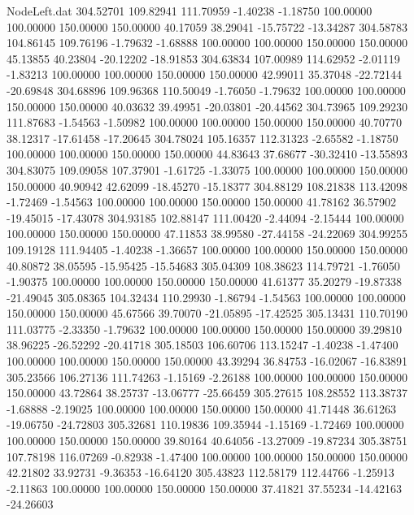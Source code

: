 \begin{filecontents}{NodeLeft.dat}
 304.52701  109.82941  111.70959    -1.40238   -1.18750  100.00000  100.00000  150.00000  150.00000   40.17059   38.29041  -15.75722  -13.34287
 304.58783  104.86145  109.76196    -1.79632   -1.68888  100.00000  100.00000  150.00000  150.00000   45.13855   40.23804  -20.12202  -18.91853
 304.63834  107.00989  114.62952    -2.01119   -1.83213  100.00000  100.00000  150.00000  150.00000   42.99011   35.37048  -22.72144  -20.69848
 304.68896  109.96368  110.50049    -1.76050   -1.79632  100.00000  100.00000  150.00000  150.00000   40.03632   39.49951  -20.03801  -20.44562
 304.73965  109.29230  111.87683    -1.54563   -1.50982  100.00000  100.00000  150.00000  150.00000   40.70770   38.12317  -17.61458  -17.20645
 304.78024  105.16357  112.31323    -2.65582   -1.18750  100.00000  100.00000  150.00000  150.00000   44.83643   37.68677  -30.32410  -13.55893
 304.83075  109.09058  107.37901    -1.61725   -1.33075  100.00000  100.00000  150.00000  150.00000   40.90942   42.62099  -18.45270  -15.18377
 304.88129  108.21838  113.42098    -1.72469   -1.54563  100.00000  100.00000  150.00000  150.00000   41.78162   36.57902  -19.45015  -17.43078
 304.93185  102.88147  111.00420    -2.44094   -2.15444  100.00000  100.00000  150.00000  150.00000   47.11853   38.99580  -27.44158  -24.22069
 304.99255  109.19128  111.94405    -1.40238   -1.36657  100.00000  100.00000  150.00000  150.00000   40.80872   38.05595  -15.95425  -15.54683
 305.04309  108.38623  114.79721    -1.76050   -1.90375  100.00000  100.00000  150.00000  150.00000   41.61377   35.20279  -19.87338  -21.49045
 305.08365  104.32434  110.29930    -1.86794   -1.54563  100.00000  100.00000  150.00000  150.00000   45.67566   39.70070  -21.05895  -17.42525
 305.13431  110.70190  111.03775    -2.33350   -1.79632  100.00000  100.00000  150.00000  150.00000   39.29810   38.96225  -26.52292  -20.41718
 305.18503  106.60706  113.15247    -1.40238   -1.47400  100.00000  100.00000  150.00000  150.00000   43.39294   36.84753  -16.02067  -16.83891
 305.23566  106.27136  111.74263    -1.15169   -2.26188  100.00000  100.00000  150.00000  150.00000   43.72864   38.25737  -13.06777  -25.66459
 305.27615  108.28552  113.38737    -1.68888   -2.19025  100.00000  100.00000  150.00000  150.00000   41.71448   36.61263  -19.06750  -24.72803
 305.32681  110.19836  109.35944    -1.15169   -1.72469  100.00000  100.00000  150.00000  150.00000   39.80164   40.64056  -13.27009  -19.87234
 305.38751  107.78198  116.07269    -0.82938   -1.47400  100.00000  100.00000  150.00000  150.00000   42.21802   33.92731   -9.36353  -16.64120
 305.43823  112.58179  112.44766    -1.25913   -2.11863  100.00000  100.00000  150.00000  150.00000   37.41821   37.55234  -14.42163  -24.26603

\end{filecontents}
